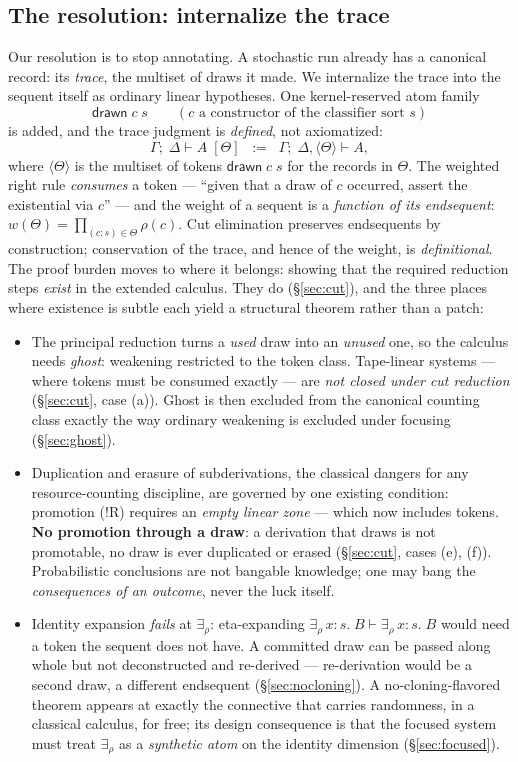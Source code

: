 \documentclass[11pt]{article}
\newcommand{\bang}{{!}}                          %
\newcommand{\erho}[2]{\exists_{\rho}\, #1{:}#2.\;} %
\newcommand{\dtok}[2]{\mathsf{drawn}\;#1\;#2}      %
\newcommand{\trz}[1]{\langle #1\rangle}            %
\newcommand{\Tr}{\Theta}                           %
\newcommand{\seq}[3]{#1;\;#2\vdash #3}             %
\newcommand{\seqt}[4]{#1;\;#2\vdash #3\;[#4]}      %
\newcommand{\wt}[1]{w(#1)}
\theoremstyle{definition}
\theoremstyle{remark}
\begin{document}
\subsection{The resolution: internalize the trace}

Our resolution is to stop annotating.  A stochastic run already has a
canonical record: its \emph{trace}, the multiset of draws it made.  We
internalize the trace into the sequent itself as ordinary linear
hypotheses.  One kernel-reserved atom family
\[
  \dtok{c}{s} \qquad (c \text{ a constructor of the classifier sort } s)
\]
is added, and the trace judgment is \emph{defined}, not axiomatized:
\[
  \seqt{\Gamma}{\Delta}{A}{\Tr} \;\;:=\;\;
  \seq{\Gamma}{\Delta,\trz{\Tr}}{A},
\]
where $\trz{\Tr}$ is the multiset of tokens $\dtok{c}{s}$ for the
records in $\Tr$.  The weighted right rule \emph{consumes} a token ---
``given that a draw of $c$ occurred, assert the existential via $c$''
--- and the weight of a sequent is a \emph{function of its endsequent}:
$\wt{\Tr} = \prod_{(c:s)\in\Tr}\rho(c)$.  Cut elimination preserves
endsequents by construction; conservation of the trace, and hence of
the weight, is \emph{definitional}.  The proof burden moves to where it
belongs: showing that the required reduction steps \emph{exist} in the
extended calculus.  They do (\S\ref{sec:cut}), and the three places
where existence is subtle each yield a structural theorem rather than a
patch:

\begin{itemize}
\item The principal reduction turns a \emph{used} draw into an
  \emph{unused} one, so the calculus needs \emph{ghost}: weakening
  restricted to the token class.  Tape-linear systems --- where tokens
  must be consumed exactly --- are \emph{not closed under cut
  reduction} (\S\ref{sec:cut}, case (a)).  Ghost is then excluded from
  the canonical counting class exactly the way ordinary weakening is
  excluded under focusing (\S\ref{sec:ghost}).
\item Duplication and erasure of subderivations, the classical dangers
  for any resource-counting discipline, are governed by one existing
  condition: promotion ($\bang$R) requires an \emph{empty linear zone}
  --- which now includes tokens.  \textbf{No promotion through a draw}:
  a derivation that draws is not promotable, no draw is ever duplicated
  or erased (\S\ref{sec:cut}, cases (e), (f)).  Probabilistic
  conclusions are not bangable knowledge; one may bang the
  \emph{consequences of an outcome}, never the luck itself.
\item Identity expansion \emph{fails} at $\exists_\rho$: eta-expanding
  $\erho{x}{s}B \vdash \erho{x}{s}B$ would need a token the sequent
  does not have.  A committed draw can be passed along whole but not
  deconstructed and re-derived --- re-derivation would be a second
  draw, a different endsequent (\S\ref{sec:nocloning}).  A
  no-cloning-flavored theorem appears at exactly the connective that
  carries randomness, in a classical calculus, for free; its design
  consequence is that the focused system must treat $\exists_\rho$ as a
  \emph{synthetic atom} on the identity dimension (\S\ref{sec:focused}).
\end{itemize}
\end{document}
